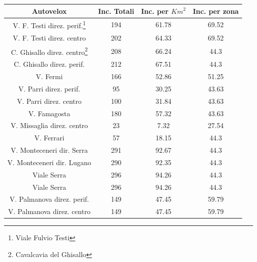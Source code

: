 \documentclass[a4paper]{report}
\begin{document}
\begin{center}
    \def\arraystretch{1.5}%
    \begin{tabular}{ |c|c|c|c| }
        \hline
        Autovelox & Inc. Totali & Inc. per $Km^2$ & Inc. per zona \\ 
        \hline
        \rowcolor{TableGray}
        V. F. Testi direz. perif.\footnote{Viale Fulvio Testi}      &   194 &   61.78   &   69.52    \\
        V. F. Testi direz. centro                                   &   202 &   64.33   &   69.52 \\
        \rowcolor{TableGray}
        C. Ghisallo direz. centro\footnote{Cavalcavia del Ghisallo} &   208 &   66.24   &   44.3 \\
        C. Ghisallo direz. perif.                                   &   212 &   67.51   &   44.3 \\
        \rowcolor{TableGray}
        V. Fermi                                                    &   166 &   52.86   &   51.25\\
        V. Parri direz. perif.                                      &    95 &   30.25   &   43.63 \\
        \rowcolor{TableGray}
        V. Parri direz. centro                                      &   100 &   31.84   &   43.63 \\
        V. Famagosta                                                &   180 &   57.32   &   43.63 \\
        \rowcolor{TableGray}
        V. Missaglia direz. centro                                  &   23  &    7.32   &   27.54 \\
        V. Ferrari                                                  &   57  &   18.15   &   44.3 \\
        \rowcolor{TableGray}
        V. Monteceneri dir. Serra                                   &   291 &   92.67   &   44.3 \\
        V. Monteceneri dir. Lugano                                  &   290 &   92.35   &   44.3 \\
        \rowcolor{TableGray}
        Viale Serra                                                 &   296 &   94.26   &   44.3 \\
        Viale Serra                                                 &   296 &   94.26   &   44.3 \\
        \rowcolor{TableGray}
        V. Palmanova direz. perif.                                  &   149 &   47.45   &   59.79\\
        V. Palmanova direz. centro                                  &   149 &   47.45   &   59.79\\
        \hline
    \end{tabular}
\end{center}
\end{document}
